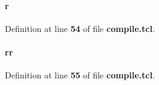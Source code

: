 \paragraph[{r}]{\setlength{\rightskip}{0pt plus 5cm}r}\label{tx__path__top_2fifo2diq_2compile_8tcl_a514f1b439f404f86f77090fa9edc96ce}


Definition at line {\bf 54} of file {\bf compile.\+tcl}.

\paragraph[{rr}]{\setlength{\rightskip}{0pt plus 5cm}rr}\label{tx__path__top_2fifo2diq_2compile_8tcl_aeb9279982226a42afdf2860dbdc29b45}


Definition at line {\bf 55} of file {\bf compile.\+tcl}.

